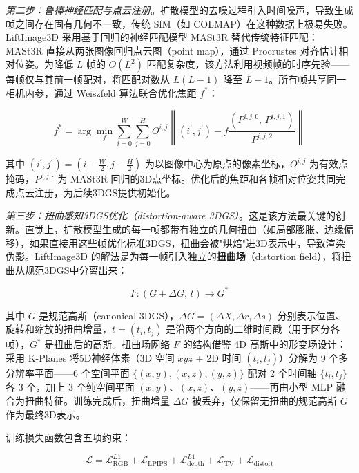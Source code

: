 \textit{第二步：鲁棒神经匹配与点云注册}。扩散模型的去噪过程引入时间噪声，导致生成帧之间存在固有几何不一致，传统 SfM（如 COLMAP）在这种数据上极易失败。LiftImage3D 采用基于回归的神经匹配模型 MASt3R 替代传统特征匹配：MASt3R 直接从两张图像回归点云图（point map），通过 Procrustes 对齐估计相对位姿。为降低 $L$ 帧的 $O(L^2)$ 匹配复杂度，该方法利用视频帧的时序先验——每帧仅与其前一帧配对，将匹配对数从 $L(L-1)$ 降至 $L-1$。所有帧共享同一相机内参，通过 Weiszfeld 算法联合优化焦距 $f^*$：

\begin{equation}
\label{eq:liftimage3d_focal}
f^* = \arg\min_f \sum_{i=0}^{W} \sum_{j=0}^{H} O^{i,j} \left\| (i^\prime, j^\prime) - f \frac{(P^{i,j,0},\, P^{i,j,1})}{P^{i,j,2}} \right\|
\end{equation}

其中 $(i^\prime, j^\prime) = (i - \frac{W}{2}, j - \frac{H}{2})$ 为以图像中心为原点的像素坐标，$O^{i,j}$ 为有效点掩码，$P^{i,j,\cdot}$ 为 MASt3R 回归的3D点坐标。优化后的焦距和各帧相对位姿共同完成点云注册，为后续3DGS提供初始化。

\textit{第三步：扭曲感知3DGS优化（distortion-aware 3DGS）}。这是该方法最关键的创新。直觉上，扩散模型生成的每一帧都带有独立的几何扭曲（如局部膨胀、边缘偏移），如果直接用这些帧优化标准3DGS，扭曲会被"烘焙"进3D表示中，导致渲染伪影。LiftImage3D 的解法是为每一帧引入独立的\textbf{扭曲场}（distortion field），将扭曲从规范3DGS中分离出来：

\begin{equation}
\label{eq:liftimage3d_distortion}
F: (G + \Delta G, \, t) \to G^*
\end{equation}

其中 $G$ 是规范高斯（canonical 3DGS），$\Delta G = (\Delta X, \Delta r, \Delta s)$ 分别表示位置、旋转和缩放的扭曲增量，$t = (t_i, t_j)$ 是沿两个方向的二维时间戳（用于区分各帧），$G^*$ 是扭曲后的高斯。扭曲场网络 $F$ 的结构借鉴 4D 高斯中的形变场设计：采用 K-Planes 将5D神经体素（3D 空间 $xyz$ + 2D 时间 $(t_i, t_j)$）分解为 9 个多分辨率平面——6 个空间平面 $\{(x,y), (x,z), (y,z)\}$ 配对 2 个时间轴 $\{t_i, t_j\}$ 各 3 个，加上 3 个纯空间平面 $(x,y)$、$(x,z)$、$(y,z)$——再由小型 MLP 融合为扭曲特征。训练完成后，扭曲增量 $\Delta G$ 被丢弃，仅保留无扭曲的规范高斯 $G$ 作为最终3D表示。

训练损失函数包含五项约束：

\begin{equation}
\label{eq:liftimage3d_loss}
\mathcal{L} = \mathcal{L}_{\mathrm{RGB}}^{L1} + \mathcal{L}_{\mathrm{LPIPS}} + \mathcal{L}_{\mathrm{depth}}^{L1} + \mathcal{L}_{\mathrm{TV}} + \mathcal{L}_{\mathrm{distort}}
\end{equation}

